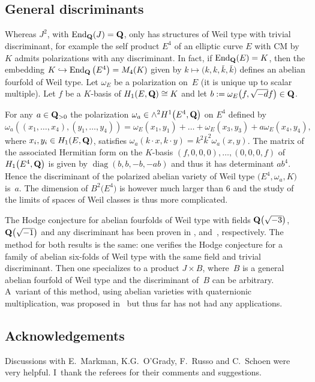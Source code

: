 \documentclass[10pt,a4paper]{amsart}
\numberwithin{equation}{section}
\begin{document}
\subsection{General discriminants} \label{gendis}
Whereas $J^2$, with $\operatorname{End}_{\bf Q}(J)={\bf Q}$, only has structures of Weil type with trivial
discriminant, for example the self product
$E^4$ of an elliptic curve $E$ with CM by $K$ admits polarizations with any discriminant.
In fact, if $\operatorname{End}_{\bf Q}(E)=K$, then the embedding
$K\hookrightarrow \operatorname{End}_{\bf Q}\big(E^4\big)=M_4(K)$ given by $k\mapsto \big(k,k,\bar{k},\bar{k}\big)$
defines an abelian fourfold of Weil type. Let $\omega_E$ be a polarization on~$E$
(it is unique up to scalar multiple). Let
$f$ be a $K$-basis of $H_1(E,{\bf Q})\cong K$ and let $b:=\omega_E\big(f,\sqrt{-d}f\big)\in{\bf Q}$.

For any $a\in{\bf Q}_{>0}$ the polarization $\omega_a\in\wedge^2H^1\big(E^4,{\bf Q}\big)$ on $E^4$ defined by
\[
\omega_a((x_1,\dots,x_4),(y_1,\dots,y_4)) = \omega_E(x_1,y_1) + \dots +
\omega_E(x_3,y_3) + a\omega_E(x_4,y_4),
\]
where $x_i,y_i\in H_1(E,{\bf Q})$, satisfies
$\omega_a(k\cdot x,k\cdot y)=k^2\bar{k}^2\omega_a(x,y)$.
The matrix of the associated Hermitian form on the $K$-basis $(f,0,0,0),\dots,(0,0,0,f)$
of $H_1\big(E^4,{\bf Q}\big)$ is given by $\operatorname{diag}(b,b,-b,-ab)$ and thus it has determinant $ab^4$.
Hence the discriminant of the polarized abelian variety of Weil type $\big(E^4,\omega_a,K\big)$ is~$a$.
The dimension of $B^2\big(E^4\big)$ is however much larger than $6$ and the study of the limits
of spaces of Weil classes is thus more complicated.

\begin{Remark} The Hodge conjecture for abelian fourfolds of Weil type with fields
${\bf Q}\big(\sqrt{-3}\big)$, ${\bf Q}\big(\sqrt{-1}\big)$ and any discriminant has been proven
in \cite{schoenhodge}, \cite{Sadd} and~\cite{Koike}, respectively.
The method for both results
is the same: one verifies the Hodge conjecture for a family of abelian six-folds of
Weil type with the same field and trivial discriminant. Then one specializes to a product
$J\times B$, where~$B$ is a general abelian fourfold of Weil type and the discriminant
of~$B$ can be arbitrary. A~variant of this method, using abelian varieties with
quaternionic multiplication, was proposed in~\cite{vGV} but thus far has not had any
applications.
\end{Remark}


\subsection*{Acknowledgements}
Discussions with E.~Markman, K.G.~O'Grady, F.~Russo and C.~Schoen were very helpful.
I~thank the referees for their comments and suggestions.
\end{document}
